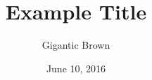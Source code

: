 \newcommand{\no}{1}
\makeatletter
\def\term{\@ifstar\@term\@@term}
\def\@term{XXYY}
\def\@@term{XX Term YEAR}
\def\lecture{\@ifstar\@lecture\@@lecture}
\def\@lecture{Abr}
\def\@@lecture{Lecture Name}
\makeatother
\author{Gigantic Brown}
\title{Example Title}
\date{June 10, 2016}
